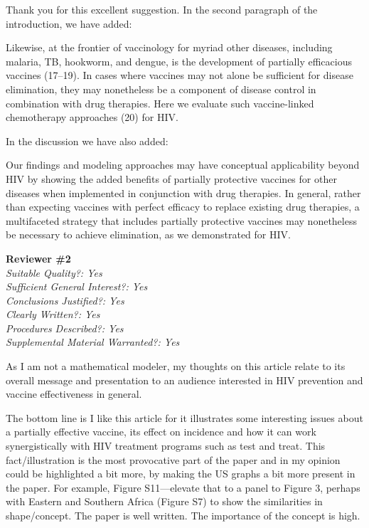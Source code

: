 \documentclass[12pt]{jpmletter}
\newcommand{\section}[1]{\textbf{#1}\\}
\newenvironment{original}{\it}{}
\begin{document}
\begin{letter}{}
    Thank you for this excellent suggestion. In the second paragraph
    of the introduction, we have added:
    \begin{quoting}
      Likewise, at the frontier of vaccinology for myriad other
      diseases, including malaria, TB, hookworm, and dengue, is the
      development of partially efficacious vaccines (17--19). In cases
      where vaccines may not alone be sufficient for disease
      elimination, they may nonetheless be a component of disease
      control in combination with drug therapies. Here we evaluate
      such vaccine-linked chemotherapy approaches (20) for HIV.
    \end{quoting}
    
    In the discussion we have also added:
    \begin{quoting}
      Our findings and modeling approaches may have conceptual
      applicability beyond HIV by showing the added benefits of
      partially protective vaccines for other diseases when
      implemented in conjunction with drug therapies. In general,
      rather than expecting vaccines with perfect efficacy to replace
      existing drug therapies, a multifaceted strategy that includes
      partially protective vaccines may nonetheless be necessary to
      achieve elimination, as we demonstrated for HIV.
    \end{quoting}
    
    \section{Reviewer \#2}
    \begin{original}
      Suitable Quality?: Yes \\
      Sufficient General Interest?: Yes \\
      Conclusions Justified?: Yes \\
      Clearly Written?: Yes \\
      Procedures Described?: Yes \\
      Supplemental Material Warranted?: Yes
 
      As I am not a mathematical modeler, my thoughts on this article
      relate to its overall message and presentation to an audience
      interested in HIV prevention and vaccine effectiveness in
      general.

      The bottom line is I like this article for it illustrates some
      interesting issues about a partially effective vaccine, its
      effect on incidence and how it can work synergistically with HIV
      treatment programs such as test and treat. This
      fact/illustration is the most provocative part of the paper and
      in my opinion could be highlighted a bit more, by making the US
      graphs a bit more present in the paper. For example, Figure
      S11—elevate that to a panel to Figure 3, perhaps with Eastern
      and Southern Africa (Figure S7) to show the similarities in
      shape/concept. The paper is well written. The importance of the
      concept is high.
    \end{original}
    

\end{letter}
\end{document}
